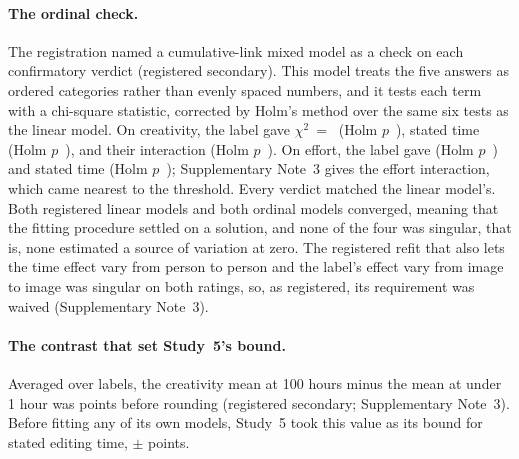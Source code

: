 \paragraph*{The ordinal check.}
The registration named a cumulative-link mixed model as a check on each confirmatory verdict (registered secondary). This model treats the five answers as ordered categories rather than evenly spaced numbers, and it tests each term with a chi-square statistic, corrected by Holm's method over the same six tests as the linear model. On creativity, the label gave $\chi^2$~=~\SThreeCreatSourceOrdChisq{} (Holm $p$~\SThreeCreatSourceOrdPHolm), stated time \SThreeCreatTimeOrdChisq{} (Holm $p$~\SThreeCreatTimeOrdPHolm), and their interaction \SThreeCreatSourceByTimeOrdChisq{} (Holm $p$~\SThreeCreatSourceByTimeOrdPHolm). On effort, the label gave \SThreeEffSourceOrdChisq{} (Holm $p$~\SThreeEffSourceOrdPHolm) and stated time \SThreeEffTimeOrdChisq{} (Holm $p$~\SThreeEffTimeOrdPHolm); Supplementary Note~3 gives the effort interaction, which came nearest to the threshold. Every verdict matched the linear model's. Both registered linear models and both ordinal models converged, meaning that the fitting procedure settled on a solution, and none of the four was singular, that is, none estimated a source of variation at zero. The registered refit that also lets the time effect vary from person to person and the label's effect vary from image to image was singular on both ratings, so, as registered, its requirement was waived (Supplementary Note~3).

\paragraph*{The contrast that set Study~5's bound.}
Averaged over labels, the creativity mean at 100 hours minus the mean at under 1 hour was \SThreeTimeContrastPrecise{} points before rounding (registered secondary; Supplementary Note~3). Before fitting any of its own models, Study~5 took this value as its bound for stated editing time, $\pm$\SFiveEditTimeBound{} points.

